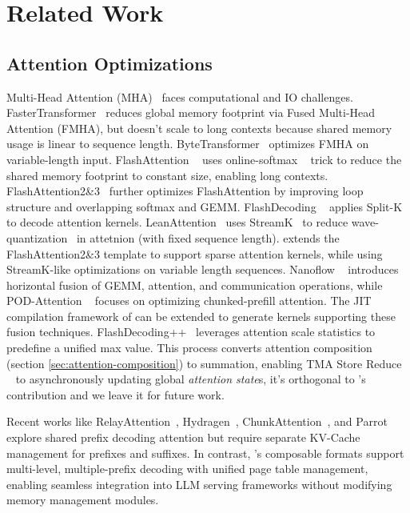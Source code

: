 \section{Related Work}
\label{sec:related-work}

\subsection{Attention Optimizations}

Multi-Head Attention (MHA)~\citep{vaswani2017transformer} faces computational and IO challenges. FasterTransformer~\citep{fastertransformer} reduces global memory footprint via Fused Multi-Head Attention (FMHA), but doesn't scale to long contexts because shared memory usage is linear to sequence length.
ByteTransformer~\citep{zhai2023bytetransformer} optimizes FMHA on variable-length input.
FlashAttention ~\citep{dao2022flashattention} uses online-softmax ~\citep{milakov2018onlinesoftmax} trick to reduce the shared memory footprint to constant size, enabling long contexts. FlashAttention2\&3~\citep{dao2023flashattention2,jay2024flashattention3} further optimizes FlashAttention by improving loop structure and overlapping softmax and GEMM. FlashDecoding ~\cite{dao2023flash-decoding} applies Split-K to decode attention kernels. LeanAttention~\cite{sanovar2024lean} uses StreamK~\citep{osama2023streamk} to reduce wave-quantization~\citep{wave-quantization} in attetnion (with fixed sequence length). \sys extends the FlashAttention2\&3 template to support sparse attention kernels, while using StreamK-like optimizations on variable length sequences. Nanoflow ~\citep{zhu2024nanoflow} introduces horizontal fusion of GEMM, attention, and communication operations, while POD-Attention ~\citep{kamath2024podattention} focuses on optimizing chunked-prefill attention. The JIT compilation framework of \sys can be extended to generate kernels supporting these fusion techniques. FlashDecoding++~\citep{flashdecodingpp} leverages attention scale statistics to predefine a unified max value. This process converts attention composition (section \ref{sec:attention-composition}) to summation, enabling TMA Store Reduce ~\citep{tma-store-reduce} to asynchronously updating global \textit{attention state}s, it's orthogonal to \sys's contribution and we leave it for future work.

Recent works like RelayAttention~\citep{zhu2024relayattention}, Hydragen~\citep{juravsky2024hydra}, ChunkAttention~\citep{ye2024chunkattention}, and Parrot~\citep{lin2024parrot} explore shared prefix decoding attention but require separate KV-Cache management for prefixes and suffixes. In contrast, \sys's composable formats support multi-level, multiple-prefix decoding with unified page table management, enabling seamless integration into LLM serving frameworks without modifying memory management modules.

